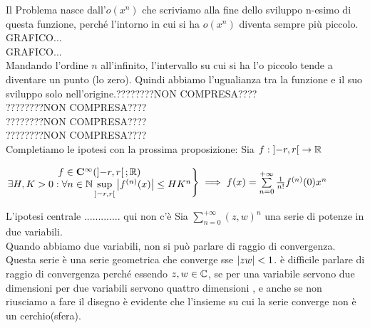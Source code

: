 Il Problema nasce dall'$o(x^n)$ che scriviamo alla fine dello sviluppo n-esimo di questa funzione, perché l'intorno in cui si ha $o(x^n)$ diventa sempre più piccolo.
GRAFICO...\\
GRAFICO...\\
Mandando l'ordine $n$ all'infinito, l'intervallo su cui si ha l'o piccolo tende a diventare un punto (lo zero). Quindi abbiamo l'ugualianza tra la funzione e il suo sviluppo solo nell'origine.????????NON COMPRESA????\\
????????NON COMPRESA????\\
????????NON COMPRESA????\\
????????NON COMPRESA????\\
Completiamo le ipotesi con la prossima proposizione:
\proposition
Sia $f:\left]-r,r\right[\to \mathbb{R}$
\begin{center}
	$\left.\begin{matrix}
	f\in \mathbf{C^{\infty}}(\left]-r,r\right[; \mathbb{R})\\
	\exists H,K >0 :\forall n\in\mathbb{N} \sup\limits_{\left]-r,r\right[}\left|f^{(n)}(x)\right| \leq HK^n\\
	\end{matrix}\right\}
	\implies f(x)=\sum\limits_{n=0}^{+\infty}\frac{1}{n!}f^{(n)}(0)x^n$
\end{center}
\observation
L'ipotesi centrale ............. qui non c'è
\observation
Sia $\sum\limits_{n=0}^{+\infty}(z,w)^n$ una serie di potenze in due variabili.\\
Quando abbiamo due variabili, non si può parlare di raggio di convergenza. Questa serie è una serie geometrica che converge sse $\left|zw\right|<1$. è  difficile parlare di raggio di convergenza  perché essendo $z,w\in\mathbb{C}$, se per una variabile servono due dimensioni per due variabili servono quattro dimensioni , e anche se non riusciamo a fare il disegno è evidente che l'insieme su cui la serie converge non è un cerchio(sfera).
